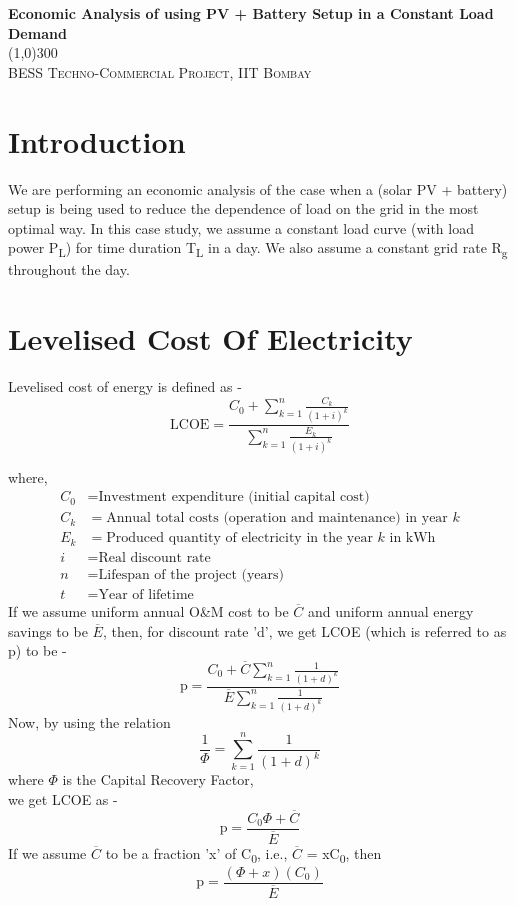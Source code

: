 \documentclass{article}
\newcommand{\Cbar}{\overline{C}}
\newcommand{\Ebar}{\overline{E}}
\begin{document}
	
	\begin{center}
		\huge{\bfseries Economic Analysis of using PV + Battery Setup in a Constant Load Demand}\\
		\line(1,0){300}\\
		[0.1in]
		\textsc{\LARGE BESS Techno-Commercial Project, IIT Bombay}
	\end{center}
\section{Introduction}
We are performing an economic analysis of the case when a (solar PV + battery) setup is being used to reduce the dependence of load on the grid in the most optimal way. In this case study, we assume a constant load curve (with load power P\textsubscript{L}) for time duration T\textsubscript{L} in a day. We also assume a constant grid rate R\textsubscript{g} throughout the day. 

\section{Levelised Cost Of Electricity}
Levelised cost of energy is defined as -\\
\[
\text{LCOE} = \frac{C_0 + \sum_{k=1}^{n} \frac{C_k}{(1+i)^k}}{\sum_{k=1}^{n} \frac{E_k}{(1+i)^k}}
\]

where,
\begin{align*}
	C_0 & = \text{Investment expenditure (initial capital cost)} \\
	C_k & = \text{Annual total costs (operation and maintenance) in year } k \\
	E_k & = \text{Produced quantity of electricity in the year } k \text{ in kWh} \\
	i & = \text{Real discount rate} \\
	n & = \text{Lifespan of the project (years)} \\
	t & = \text{Year of lifetime}
\end{align*}
\newline
If we assume uniform annual O\&M cost to be \(\Cbar\) and uniform annual energy savings to be \(\Ebar\), then, for discount rate 'd', we get LCOE (which is referred to as p) to be - \\
\[
\text{p} = \frac{C_0 + \Cbar \sum_{k=1}^{n} \frac{1}{(1+d)^k}}{\Ebar \sum_{k=1}^{n} \frac{1}{(1+d)^k}}
\]
\newline
\newline
Now, by using the relation
\[
\frac{1}{\Phi} = \sum_{k=1}^{n} \frac{1}{(1+d)^k}
\]
where \(\Phi\) is the Capital Recovery Factor, \\
we get LCOE as -\\
\[
\text{p} = \frac{C_0 \Phi + \Cbar}{\Ebar}
\]
If we assume \(\Cbar\) to be a fraction 'x' of C\textsubscript{0}, i.e., \(\Cbar\) = xC\textsubscript{0}, then
\begin{equation}
	\text{p} = \frac{(\Phi + x)(C_0)}{\Ebar}
\end{equation}
\vspace{10pt}
\end{document}
